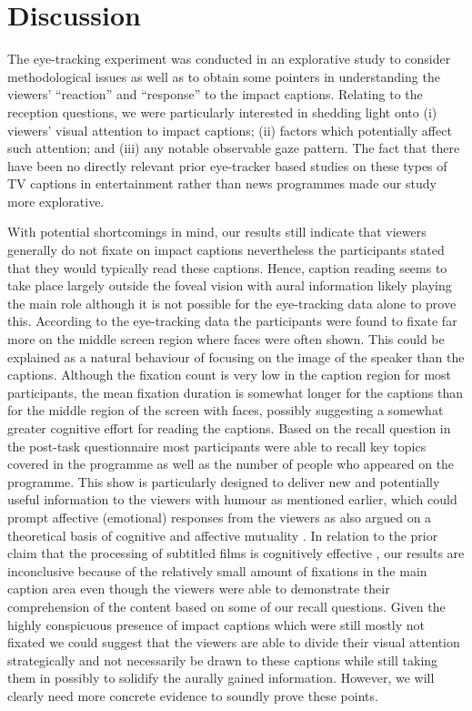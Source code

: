 \documentclass[output=paper]{langsci/langscibook}
\begin{document}
\section{Discussion}

The eye-tracking experiment was conducted in an explorative study to consider methodological issues as well as to obtain some pointers in understanding the viewers' ``reaction'' and ``response'' to the impact captions. Relating to the reception questions, we were particularly interested in shedding light onto (i) viewers' visual attention to impact captions; (ii) factors which potentially affect such attention; and (iii) any notable observable gaze pattern. The fact that there have been no directly relevant prior eye-tracker based studies on these types of TV captions in entertainment rather than news programmes made our study more explorative. 


With potential shortcomings in mind, our results still indicate that viewers generally do not fixate on impact captions nevertheless the participants stated that they would typically read these captions.  Hence, caption reading seems to take place largely outside the foveal vision with aural information likely playing the main role although it is not possible for the eye-tracking data alone to prove this. According to the eye-tracking data the participants were found to fixate far more on the middle screen region where faces were often shown. This could be explained as a natural behaviour of focusing on the image of the speaker than the captions. Although the fixation count is very low in the caption region for most participants, the mean fixation duration is somewhat longer for the captions than for the middle region of the screen with faces, possibly suggesting a somewhat greater cognitive effort for reading the captions. Based on the recall question in the post-task questionnaire most participants were able to recall key topics covered in the programme as well as the number of people who appeared on the programme. This show is particularly designed to deliver new and potentially useful information to the viewers with humour as mentioned earlier, which could prompt affective (emotional) responses from the viewers as also argued on a theoretical basis of cognitive and affective mutuality \citep{Shiota2003, Sasamoto2014}. In relation to the prior claim that the processing of subtitled films is cognitively effective \citep{perego2010}, our results are inconclusive because of the relatively small amount of fixations in the main caption area even though the viewers were able to demonstrate their comprehension of the content based on some of our recall questions.  Given the highly conspicuous presence of impact captions which were still mostly not fixated we could suggest that the viewers are able to divide their visual attention strategically and not necessarily be drawn to these captions while still taking them in possibly to solidify the aurally gained information.  However, we will clearly need more concrete evidence to soundly prove these points. 
\end{document}
